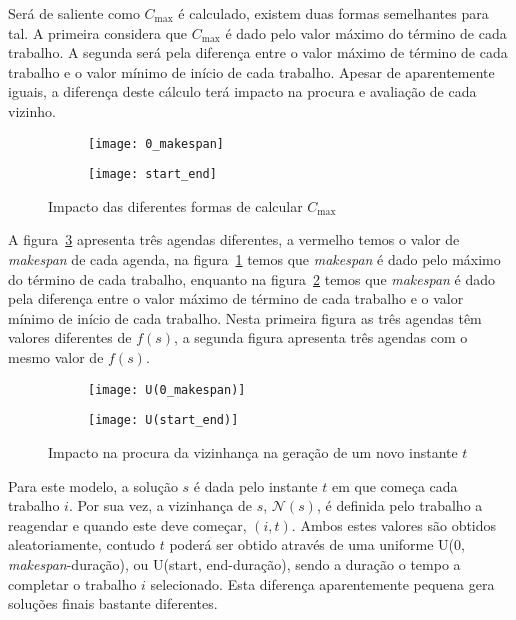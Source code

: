 Será de saliente como $C_{\max}$ é calculado, existem duas formas semelhantes para tal. A primeira considera que $C_{\max}$ é dado pelo valor máximo do término de cada trabalho. A segunda será pela diferença entre o valor máximo de término de cada trabalho e o valor mínimo de início de cada trabalho. Apesar de aparentemente iguais, a diferença deste cálculo terá impacto na procura e avaliação de cada vizinho.\\
\begin{figure}[H]
	\centering
	\begin{subfigure}{0.49\textwidth}
	\centering
		\texttt{[image: 0\_makespan]}
		\caption{}
		\label{fig:dif_makespan_a}
	\end{subfigure}
	\begin{subfigure}{0.49\textwidth}
	\centering
		\texttt{[image: start\_end]}
		\caption{}
		\label{fig:dif_makespan_b}
	\end{subfigure}
	\caption{Impacto das diferentes formas de calcular $C_{\max}$}
	\label{fig:dif_makespan}
\end{figure}
A figura~\ref{fig:dif_makespan} apresenta três agendas diferentes, a vermelho temos o valor de \textit{makespan} de cada agenda, na figura~\ref{fig:dif_makespan_a} temos que \textit{makespan} é dado pelo máximo do término de cada trabalho, enquanto na figura~\ref{fig:dif_makespan_b} temos que \textit{makespan} é dado pela diferença entre o valor máximo de término de cada trabalho e o valor mínimo de início de cada trabalho. Nesta primeira figura as três agendas têm valores diferentes de $f(s)$, a segunda figura apresenta três agendas com o mesmo valor de $f(s)$.\\
\begin{figure}[H]
	\centering
	\begin{subfigure}{0.49\textwidth}
	\centering
		\texttt{[image: U(0\_makespan)]}
		\caption{}
		\label{fig:dif_uniform_a}
	\end{subfigure}
	\begin{subfigure}{0.49\textwidth}
	\centering
		\texttt{[image: U(start\_end)]}
		\caption{}
		\label{fig:dif_uniform_b}
	\end{subfigure}
	\caption{Impacto na procura da vizinhança na geração de um novo instante $t$}
	\label{fig:dif_uniform}
\end{figure}
Para este modelo, a solução $s$ é dada pelo instante $t$ em que começa cada trabalho $i$. Por sua vez, a vizinhança de $s$, $\mathcal{N}(s)$, é definida pelo trabalho a reagendar e quando este deve começar, $(i, t)$. Ambos estes valores são obtidos aleatoriamente, contudo $t$ poderá ser obtido através de uma uniforme U(0, \textit{makespan}-duração), ou U(start, end-duração), sendo a duração o tempo a completar o trabalho $i$ selecionado. Esta diferença aparentemente pequena gera soluções finais bastante diferentes.\\

